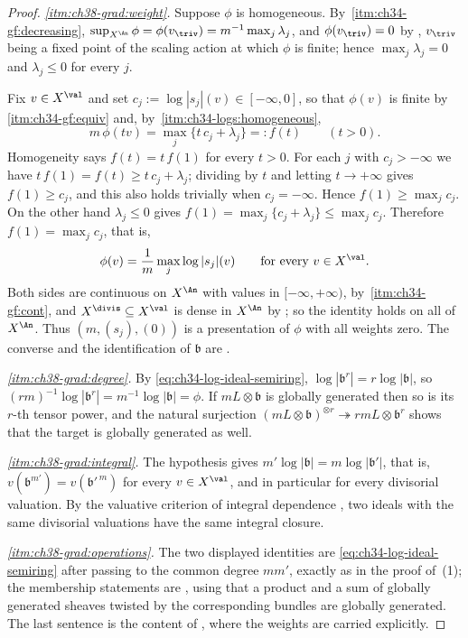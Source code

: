 \begin{proof}
\emph{\cref{itm:ch38-grad:weight}.}  Suppose $\phi$ is homogeneous.  By
\,\cref{itm:ch34-gf:decreasing},
$\sup_{X^{\An}}\phi=\phi(v_{\triv})=m^{-1}\max_j\lambda_j$, and
$\phi(v_{\triv})=0$ by
, $v_{\triv}$ being a fixed
point of the scaling action at which $\phi$ is finite; hence
$\max_j\lambda_j=0$ and $\lambda_j\leq0$ for every $j$.

Fix $v\in X^{\val}$ and set $c_j:=\log|s_j|(v)\in[-\infty,0]$, so that
$\phi(v)$ is finite by
\,\cref{itm:ch34-gf:equiv} and, by
\,\cref{itm:ch34-logs:homogeneous},
\[
 m\,\phi(tv)=\max_j\{t\,c_j+\lambda_j\}=:f(t)
 \qquad(t>0).
\]
Homogeneity says $f(t)=t\,f(1)$ for every $t>0$.  For each $j$ with
$c_j>-\infty$ we have $t\,f(1)=f(t)\geq t\,c_j+\lambda_j$; dividing by
$t$ and letting $t\to+\infty$ gives $f(1)\geq c_j$, and this also
holds trivially when $c_j=-\infty$.  Hence
$f(1)\geq\max_jc_j$.  On the other hand $\lambda_j\leq0$ gives
$f(1)=\max_j\{c_j+\lambda_j\}\leq\max_jc_j$.  Therefore
$f(1)=\max_jc_j$, that is,
\[
 \phi(v)=\frac1m\max_j\log|s_j|(v)
 \qquad\text{for every }v\in X^{\val}.
\]
Both sides are continuous on $X^{\An}$ with values in
$[-\infty,+\infty)$, by
\,\cref{itm:ch34-gf:cont}, and
$X^{\divis}\subseteq X^{\val}$ is dense in $X^{\An}$ by
; so the identity holds on all of
$X^{\An}$.  Thus $(m,(s_j),(0))$ is a presentation of $\phi$ with all
weights zero.  The converse and the identification of $\mathfrak b$ are
.

\emph{\cref{itm:ch38-grad:degree}.}  By
\eqref{eq:ch34-log-ideal-semiring},
$\log|\mathfrak b^r|=r\log|\mathfrak b|$, so
$(rm)^{-1}\log|\mathfrak b^r|=m^{-1}\log|\mathfrak b|=\phi$.  If
$mL\otimes\mathfrak b$ is globally generated then so is its $r$-th
tensor power, and the natural surjection
$(mL\otimes\mathfrak b)^{\otimes r}\twoheadrightarrow
rmL\otimes\mathfrak b^{r}$ shows that the target is globally generated as
well.

\emph{\cref{itm:ch38-grad:integral}.}  The hypothesis gives
$m'\log|\mathfrak b|=m\log|\mathfrak b'|$, that is,
$v(\mathfrak b^{m'})=v(\mathfrak b'^{\,m})$ for every
$v\in X^{\val}$, and in particular for every divisorial valuation.  By
the valuative criterion of integral dependence
, two ideals with the same
divisorial valuations have the same integral closure.

\emph{\cref{itm:ch38-grad:operations}.}  The two displayed identities are
\eqref{eq:ch34-log-ideal-semiring} after passing to the common degree
$mm'$, exactly as in the proof of
\,(1); the membership statements are
, using that a product and a sum of globally
generated sheaves twisted by the corresponding bundles are globally
generated.  The last sentence is the content of
, where the weights are carried explicitly.
\end{proof}

